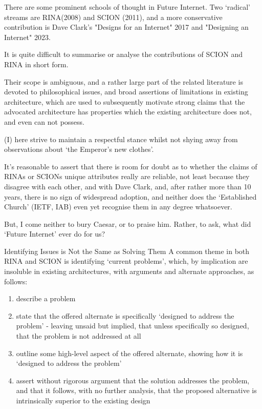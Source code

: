 

There are some prominent schools of thought in Future Internet.
Two `radical' streams are RINA(2008) and SCION (2011),
and a more conservative contribution is Dave Clark's "Designs for an Internet" 2017 and "Designing an Internet" 2023.

It is quite difficult to summarise or analyse the contributions of SCION and RINA in short form.

Their scope is ambiguous, and a rather large part of the related literature is devoted to philosophical issues, and broad assertions of limitations in existing architecture, which are used to subsequently motivate  strong claims that the advocated architecture has properties which the existing architecture does not, and even can not possess.

(I) here strive to maintain a respectful stance whilst not shying away from observations about `the Emperor's new clothes'.

It's reasonable to assert that there is room for doubt as to whether the claims of RINAs or SCIONs unique attributes really are reliable, not least because they disagree with each other, and with Dave Clark,
and, after rather more than 10 years, there is no sign of widespread adoption, and neither does the `Established Church' (IETF, IAB) even yet recognise them in any degree whatsoever.

But, I come neither to bury Caesar, or to praise him.  Rather, to ask, what did `Future Internet' ever do for us?


Identifying Issues is Not the Same as Solving Them
A common theme in both RINA and SCION is identifying `current problems', which, by implication are insoluble in existing architectures, with arguments and alternate approaches, as follows:
\begin{enumerate}
    \item describe a problem
    \item state that the offered alternate is specifically `designed to address the problem' - leaving unsaid but implied, that unless specifically so designed, that the problem is not addressed at all
    \item outline some high-level aspect of the offered alternate,  showing how it is `designed to address the problem'
    \item assert without rigorous argument that the solution addresses the problem, and that it follows, with no further analysis, that the proposed alternative is intrinsically superior to the existing design
\end{enumerate}

